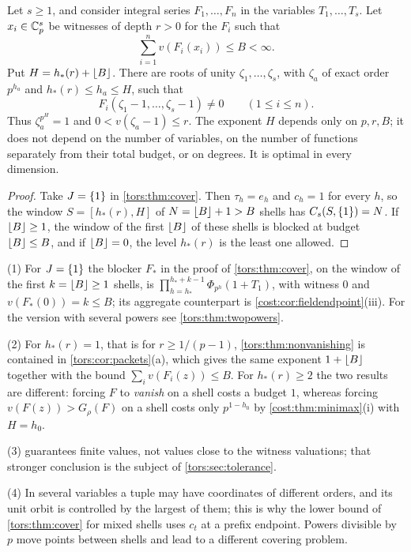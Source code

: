 \begin{corollary}\label{tors:thm:nonvanishing}
Let $s\ge1$, and consider integral series $F_1,\dots,F_n$ in the variables
$T_1,\dots,T_s$. Let $x_i\in\mathbb{C}_p^s$ be witnesses of depth $r>0$ for the $F_i$ such that
\[
  \sum_{i=1}^nv(F_i(x_i))\le B<\infty .
\]
Put $H=h_*(r)+\lfloor B\rfloor$. There are roots of unity $\zeta_1,\dots,\zeta_s$, with
$\zeta_a$ of exact order $p^{h_a}$ and $h_*(r)\le h_a\le H$, such that
\[
  F_i(\zeta_1-1,\dots,\zeta_s-1)\ne0\qquad(1\le i\le n).
\]
Thus $\zeta_a^{p^H}=1$ and $0<v(\zeta_a-1)\le r$. The exponent $H$ depends only on
$p,r,B$; it does not depend on the number of variables, on the number of functions
separately from their total budget, or on degrees. It is optimal in every dimension.
\end{corollary}

\begin{proof}
Take $J=\{1\}$ in \cref{tors:thm:cover}. Then $\tau_h=e_h$ and $c_h=1$ for every $h$, so
the window $S=[h_*(r),H]$ of $N=\lfloor B\rfloor+1>B$ shells has $C_s(S,\{1\})=N$. If
$\lfloor B\rfloor\ge1$, the window of the first $\lfloor B\rfloor$ of these shells is blocked at budget
$\lfloor B\rfloor\le B$, and if $\lfloor B\rfloor=0$, the level $h_*(r)$ is the least one allowed.
\end{proof}

\begin{remark}\label{tors:rem:nonvanishing}
(1) For $J=\{1\}$ the blocker $F_*$ in the proof of \cref{tors:thm:cover}, on the window
of the first $k=\lfloor B\rfloor\ge1$ shells, is $\prod_{h=h_*}^{h_*+k-1}\Phi_{p^h}(1+T_1)$, with
witness $0$ and $v(F_*(0))=k\le B$; its aggregate counterpart is
\cref{cost:cor:fieldendpoint}\textup{(iii)}. For the version with several powers see
\cref{tors:thm:twopowers}.

(2) For $h_*(r)=1$, that is for $r\ge1/(p-1)$, \cref{tors:thm:nonvanishing} is contained
in \cref{tors:cor:packets}(a), which gives the same exponent $1+\lfloor B\rfloor$ together with
the bound $\sum_iv(F_i(z))\le B$. For $h_*(r)\ge2$ the two results are different: forcing
$F$ to \emph{vanish} on a shell costs a budget $1$, whereas forcing
$v(F(z))>G_\rho(F)$ on a shell costs only $p^{1-h_0}$ by \cref{cost:thm:minimax}\textup{(i)}
with $H=h_0$.

(3)  guarantees finite values, not values close to the
witness valuations; that stronger conclusion is the subject of \cref{tors:sec:tolerance}.

(4) In several variables a tuple may have coordinates of different orders, and its unit
orbit is controlled by the largest of them; this is why the lower bound of
\cref{tors:thm:cover} for mixed shells uses $c_t$ at a prefix endpoint. Powers divisible by
$p$ move points between shells and lead to a different covering problem.
\end{remark}

